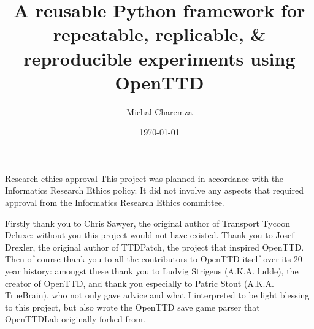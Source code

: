 \documentclass[logo,msc,dsti]{style/infthesis}    %
\begin{document}
\begin{preliminary}

\title{A reusable Python framework for repeatable, replicable, \& reproducible experiments using OpenTTD}

\author{Michal Charemza}

\date{\today}


\maketitle

\newenvironment{ethics}
   {\begin{frontenv}{Research ethics approval}{\LARGE}}
   {\end{frontenv}\newpage}

\begin{ethics}
This project was planned in accordance with the Informatics Research
Ethics policy. It did not involve any aspects that required approval
from the Informatics Research Ethics committee.
\standarddeclaration
\end{ethics}

\begin{acknowledgements}

Firstly thank you to Chris Sawyer, the original author of Transport Tycoon Deluxe: without you this project would not have existed. Thank you to Josef Drexler, the original author of TTDPatch, the project that inspired OpenTTD. Then of course thank you to all the contributors to OpenTTD itself over its 20 year history: amongst these thank you to Ludvig Strigeus (A.K.A. ludde), the creator of OpenTTD, and thank you especially to Patric Stout (A.K.A. TrueBrain), who not only gave advice and what I interpreted to be light blessing to this project, but also wrote the OpenTTD save game parser that OpenTTDLab originally forked from.


\end{acknowledgements}
\end{preliminary}
\end{document}
